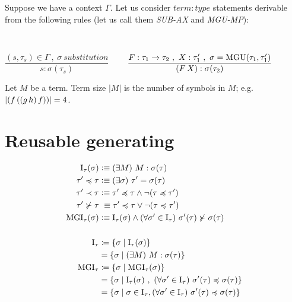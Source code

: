 \documentclass[a4paper,oneside]{memoir}
\begin{document}
\newcommand{\binRule}[3]{\dfrac{#1\ ,\ #2}{#3}}
\newcommand{\triRule}[4]{\dfrac{#1\ ,\ #2\ , \ #3}{#4}}
\newcommand{\isSub}[1]{#1\ \mathit{substitution}}
\newcommand{\MGU}[2]{\op{MGU}(#1,#2)}

\newcommand{\subAx}{\textit{SUB-AX}\xspace}
\newcommand{\mguMp}{\textit{MGU-MP}\xspace}
\newcommand{\abs}[1]{\lvert #1 \rvert}

Suppose we have a context $\Gamma$. Let us consider $\mathit{term:type}$ statements derivable from the following rules (let us call them \subAx and \mguMp):

~

$\binRule{(s,\tau_s) \in \Gamma}{\isSub{\sigma}}{s : \sigma(\tau_s)}$
~~~
$\triRule{F : \tau_1 \ar \tau_2}{X : \tau^\prime_1}{\sigma = \MGU{\tau_1}{\tau^\prime_1}}{\ap{F}{X} : \sigma(\tau_2)}$


\begin{definition}
Let $M$ be a term. Term size $\abs{M}$ is the number of symbols in $M$; e.g. $\abs{\ap{f}{\ap{\ap{g}{h}}{f}}} = 4$. 
\end{definition}

\section{Reusable generating}

\newcommand{\inhab}[1]{\op{I}(#1)}
\newcommand{\sigmaPr}{\sigma^\prime}
\newcommand{\tauPr}{\tau^\prime}
\newcommand{\xPr}{x^\prime}
\newcommand{\subOrd}[2]{#1 \preccurlyeq #2}
\newcommand{\strictSubOrd}[2]{#1 \prec #2}



\begin{align*}
\op{I}_\tau(\sigma)   &\defe \E{M}{M : \sigma(\tau)}  \\
\subOrd{\tauPr}{\tau} &\defe \E{\sigma}{\tauPr = \sigma(\tau)} \\
\strictSubOrd{\tauPr}{\tau} &\defe \subOrd{\tauPr}{\tau} \wedge \neg (\subOrd{\tau}{\tauPr}) \\
\tauPr \nsucc \tau &\ \equiv \subOrd{\tauPr}{\tau} \vee  \neg ( \subOrd{\tau}{\tauPr})   \\   
\op{MGI}_\tau(\sigma) &\defe \op{I}_\tau(\sigma) \wedge \Ain{\sigmaPr}{\op{I}_\tau}{\sigmaPr(\tau) \nsucc \sigma(\tau)}\\
~\\
\op{I}_\tau &\defi \{ \sigma \mid \op{I}_\tau(\sigma)  \}  \\
 &= \{ \sigma \mid \E{M}{M : \sigma(\tau)}  \} \\
\op{MGI}_\tau &\defi \{ \sigma \mid \op{MGI}_\tau(\sigma)  \}  \\
 &= \{ \sigma \mid \op{I}_\tau(\sigma)\ ,\ \Ain{\sigmaPr}{\op{I}_\tau}{\subOrd{\sigmaPr(\tau)}{ \sigma(\tau)}}  \} \\
 &= \{ \sigma \mid \sigma \in \op{I}_\tau,\Ain{\sigmaPr}{\op{I}_\tau}{\subOrd{\sigmaPr(\tau)}{ \sigma(\tau)}}  \}
\end{align*}
\end{document}
